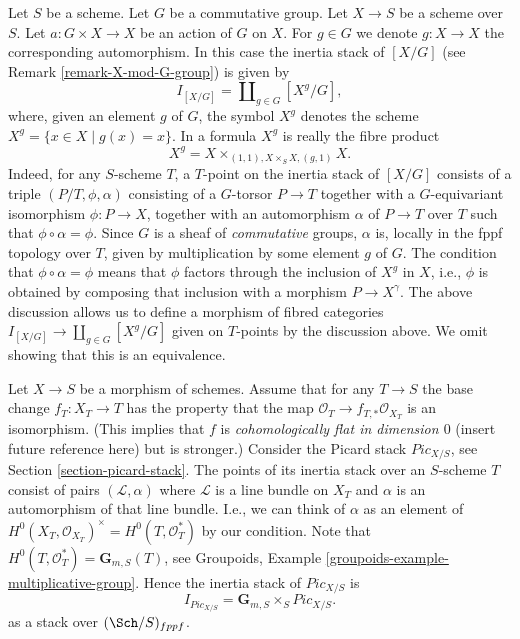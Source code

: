 \begin{example}
\label{example-inertia-stack-of-X-mod-G}
Let $S$ be a scheme. Let $G$ be a commutative group.
Let $X \to S$ be a scheme over $S$.
Let $a : G \times X \to X$ be an action of $G$ on $X$.
For $g \in G$ we denote $g : X \to X$ the corresponding automorphism.
In this case the inertia stack of $[X/G]$ (see
Remark \ref{remark-X-mod-G-group})
is given by
$$	
I_{[X/G]} = \coprod\nolimits_{g\in G} [X^g/G],
$$	
where, given an element $g$ of $G$, the symbol $X^g$ denotes the
scheme $X^g = \{x \in X \mid g(x) = x\}$. In a formula
$X^g$ is really the fibre
product
$$
X^g =  X \times_{(1, 1), X \times_S X, (g, 1)} X.
$$
Indeed, for any $S$-scheme $T$, a
$T$-point on the inertia stack of $[X/G]$ consists of a
triple $(P/T, \phi, \alpha)$ consisting of a $G$-torsor
$P\to T$ together with a $G$-equivariant isomorphism
$\phi : P \to X$, together
with an automorphism $\alpha$ of $P\to T$ over $T$ such that
$\phi \circ \alpha = \phi$.
Since $G$ is a sheaf of \emph{commutative} groups,
$\alpha$ is, locally in the fppf topology over $T$,
given by multiplication by some element $g$ of $G$.
The condition that $\phi \circ \alpha = \phi$ means that $\phi$
factors through the inclusion of $X^g$
in $X$, i.e., $\phi$ is obtained by composing that inclusion with a
morphism $P \to X^\gamma$.
The above discussion allows us to define a morphism of fibred categories
$I_{[X/G]} \to \coprod_{g\in G} [X^g/G]$ given on $T$-points by the discussion
above. We omit showing that this is an equivalence.
\end{example}

\begin{example}
\label{example-inertia-stack-of-picard}
Let $X\to S$ be a morphism of schemes.
Assume that for any $T \to S$ the base change $f_T : X_T \to T$
has the property that the map $\mathcal{O}_T \to f_{T, *}\mathcal{O}_{X_T}$
is an isomorphism. (This implies that $f$ is
{\it cohomologically flat in dimension $0$} (insert future reference here)
but is stronger.) Consider the Picard stack $\textit{Pic}_{X/S}$, see
Section \ref{section-picard-stack}.
The points of its inertia stack over an
$S$-scheme $T$ consist of pairs $(\mathcal{L}, \alpha)$
where $\mathcal{L}$ is a line bundle
on $X_T$ and $\alpha$ is an automorphism of that line bundle.
I.e., we can think of $\alpha$ as an element of
$H^0(X_T, \mathcal{O}_{X_T})^\times = H^0(T, \mathcal{O}_T^*)$
by our condition. Note that $H^0(T, \mathcal{O}_T^*) = \mathbf{G}_{m, S}(T)$,
see Groupoids, Example \ref{groupoids-example-multiplicative-group}.
Hence the inertia stack of $\textit{Pic}_{X/S}$ is
$$
I_{\textit{Pic}_{X/S}} = \mathbf{G}_{m, S} \times_S \textit{Pic}_{X/S}.
$$
as a stack over $(\Sch/S)_{fppf}$.
\end{example}






